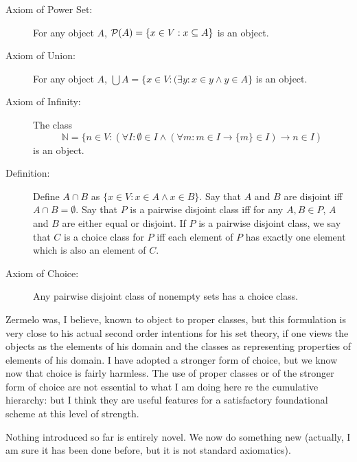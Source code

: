 \documentclass[12pt]{article}
\begin{document}
\begin{description}
\item[Axiom of Power Set:]  For any object $A$, ${\cal P}(A) = \{x\in V:x \subseteq A\}$ is an object.

\item[Axiom of Union:]  For any object $A$, $\bigcup A = \{x \in V:(\exists y:x \in y \wedge y \in A\}$ is an object.

\item[Axiom of Infinity:]  The class $$\mathbb N = \{n \in V:(\forall I:\emptyset \in I \wedge (\forall m:m\in I \rightarrow \{m\} \in I) \rightarrow n \in I)$$ is an object.

\item[Definition:]  Define $A \cap B$ as $\{x \in V:x \in A \wedge x \in B\}$.  Say that $A$ and $B$ are disjoint iff $A \cap B = \emptyset$.  Say that $P$ is a pairwise disjoint class iff
for any $A,B \in P$, $A$ and $B$ are either equal or disjoint.  If $P$ is a pairwise disjoint class, we say that $C$ is a choice class for $P$ iff each element of $P$ has exactly one element which is also an element of $C$.

\item[Axiom of Choice:]  Any pairwise disjoint class of nonempty sets has a choice class.

\end{description}

Zermelo was, I believe, known to object to proper classes, but this formulation is very close to his actual second order intentions for his set theory, if one views the objects as the elements of his domain and the classes as representing properties of elements of his domain.  I have adopted a stronger form of choice, but we know now that choice is fairly harmless.  The use of proper classes or of the stronger form of choice are not essential to what I am doing here re the cumulative hierarchy:  but I think they are useful features for a satisfactory foundational scheme at this level of strength.

Nothing introduced so far is entirely novel.  We now do something new (actually, I am sure it has been done before, but it is not standard axiomatics).
\end{document}
